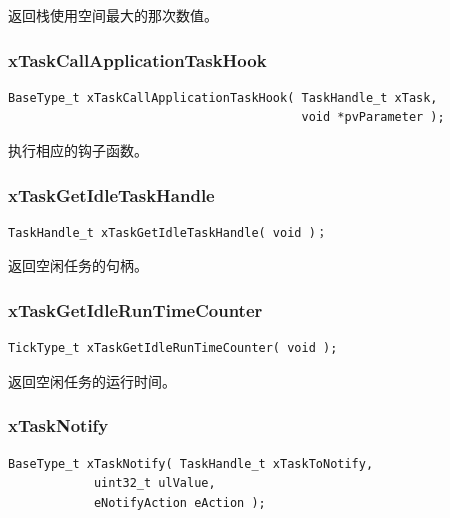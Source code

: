 \documentclass[12pt, a4paper]{article}
\begin{document}
返回栈使用空间最大的那次数值。

\subsubsection {xTaskCallApplicationTaskHook}

\begin{lstlisting}[language={[ANSI]C},keywordstyle=\color{blue!70},commentstyle=\color{red!50!green!50!blue!50},frame=shadowbox, rulesepcolor=\color{red!20!green!20!blue!20}]
BaseType_t xTaskCallApplicationTaskHook( TaskHandle_t xTask, 
                                         void *pvParameter );
\end{lstlisting}

执行相应的钩子函数。

\subsubsection {xTaskGetIdleTaskHandle}

\begin{lstlisting}[language={[ANSI]C},keywordstyle=\color{blue!70},commentstyle=\color{red!50!green!50!blue!50},frame=shadowbox, rulesepcolor=\color{red!20!green!20!blue!20}]
TaskHandle_t xTaskGetIdleTaskHandle( void )；
\end{lstlisting}

返回空闲任务的句柄。

\subsubsection {xTaskGetIdleRunTimeCounter}

\begin{lstlisting}[language={[ANSI]C},keywordstyle=\color{blue!70},commentstyle=\color{red!50!green!50!blue!50},frame=shadowbox, rulesepcolor=\color{red!20!green!20!blue!20}]
TickType_t xTaskGetIdleRunTimeCounter( void );
\end{lstlisting}

返回空闲任务的运行时间。

\subsubsection {xTaskNotify}

\begin{lstlisting}[language={[ANSI]C},keywordstyle=\color{blue!70},commentstyle=\color{red!50!green!50!blue!50},frame=shadowbox, rulesepcolor=\color{red!20!green!20!blue!20}]
BaseType_t xTaskNotify( TaskHandle_t xTaskToNotify, 
			uint32_t ulValue, 
			eNotifyAction eAction );
\end{lstlisting}
\end{document}
